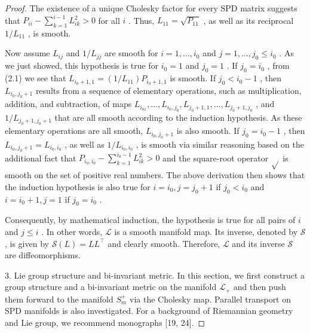 \documentclass[11pt]{article}
\begin{document}
\begin{proof}
The existence of a unique Cholesky factor for every SPD matrix suggests that  $P_{ii} - \sum_{k=1}^{i-1} L_{ik}^2 > 0$  for all  $i$ . Thus,  $L_{11} = \sqrt{P_{11}}$ , as well as its reciprocal  $1 / L_{11}$ , is smooth.

Now assume  $L_{ij}$  and  $1 / L_{jj}$  are smooth for  $i = 1, \ldots, i_0$  and  $j = 1, \ldots, j_0 \leq i_0$ . As we just showed, this hypothesis is true for  $i_0 = 1$  and  $j_0 = 1$ . If  $j_0 = i_0$ , from (2.1) we see that  $L_{i_0 + 1,1} = (1 / L_{11})P_{i_0 + 1,1}$  is smooth. If  $j_0 < i_0 - 1$ , then  $L_{i_0,j_0 + 1}$  results from a sequence of elementary operations, such as multiplication, addition, and subtraction, of maps  $L_{i_01}, \ldots, L_{i_0,j_0}, L_{j_0 + 1,1}, \ldots, L_{j_0 + 1,j_0}$ , and  $1 / L_{j_0 + 1,j_0 + 1}$  that are all smooth according to the induction hypothesis. As these elementary operations are all smooth,  $L_{i_0,j_0 + 1}$  is also smooth. If  $j_0 = i_0 - 1$ , then  $L_{i_0,j_0 + 1} = L_{i_0,i_0}$ , as well as  $1 / L_{i_0,i_0}$ , is smooth via similar reasoning based on the additional fact that  $P_{i_0,i_0} - \sum_{k=1}^{i_0-1}L_{ik}^2 > 0$  and the square-root operator  $\sqrt{}$  is smooth on the set of positive real numbers. The above derivation then shows that the induction hypothesis is also true for  $i = i_0, j = j_0 + 1$  if  $j_0 < i_0$  and  $i = i_0 + 1, j = 1$  if  $j_0 = i_0$ .

Consequently, by mathematical induction, the hypothesis is true for all pairs of  $i$  and  $j \leq i$ . In other words,  $\mathcal{L}$  is a smooth manifold map. Its inverse, denoted by  $\mathcal{S}$ , is given by  $\mathcal{S}(L) = LL^{\top}$  and clearly smooth. Therefore,  $\mathcal{L}$  and its inverse  $\mathcal{S}$  are diffeomorphisms.

3. Lie group structure and bi-invariant metric. In this section, we first construct a group structure and a bi-invariant metric on the manifold  $\mathcal{L}_{+}$  and then push them forward to the manifold  $S_{m}^{+}$  via the Cholesky map. Parallel transport on SPD manifolds is also investigated. For a background of Riemannian geometry and Lie group, we recommend monographs [19, 24].


\end{proof}
\end{document}
